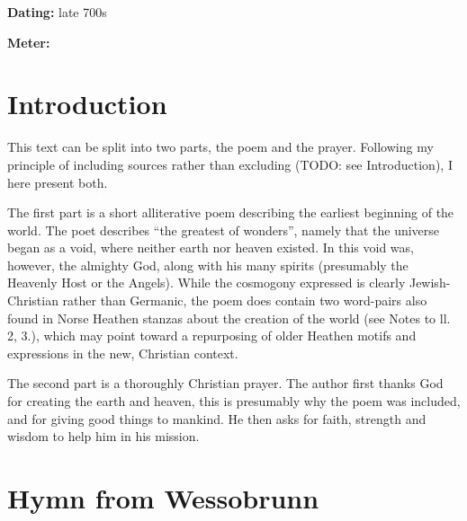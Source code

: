 
\begin{flushright}%
\textbf{Dating:} late 700s

\textbf{Meter:} \Fornyrdislag%
\end{flushright}%

\section{Introduction}

This text can be split into two parts, the poem and the prayer. Following my principle of including sources rather than excluding (TODO: see Introduction), I here present both.

The first part is a short alliterative poem describing the earliest beginning of the world. The poet describes “the greatest of wonders”, namely that the universe began as a void, where neither earth nor heaven existed. In this void was, however, the almighty God, along with his many spirits (presumably the Heavenly Host or the Angels). While the cosmogony expressed is clearly Jewish-Christian rather than Germanic, the poem does contain two word-pairs also found in Norse Heathen stanzas about the creation of the world (see Notes to ll. 2, 3.), which may point toward a repurposing of older Heathen motifs and expressions in the new, Christian context.

The second part is a thoroughly Christian prayer. The author first thanks God for creating the earth and heaven, this is presumably why the poem was included, and for giving good things to mankind. He then asks for faith, strength and wisdom to help him in his mission.

\sectionline

\section{Hymn from Wessobrunn}

